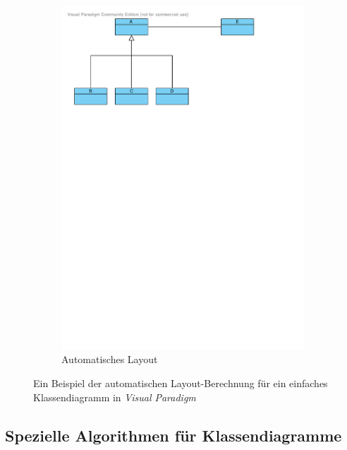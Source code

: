 \begin{figure}[hbt]
\begin{subfigure}{\rightsubfigurewidth}
        \includegraphics[scale=\graphicsscale]{assets/visual-paradigm-auto-layout-b}
        \caption{Automatisches Layout}
        \label{fig:visual-paradigm-auto-layout-b}
    \end{subfigure}
    \caption{Ein Beispiel der automatischen Layout-Berechnung für ein einfaches Klassendiagramm in \textit{Visual Paradigm}}
    \label{fig:visual-paradigm-auto-layout}
\end{figure}

\subsection{Spezielle Algorithmen für Klassendiagramme}
\label{subsec:special-algorithms-for-class-diagrams}


